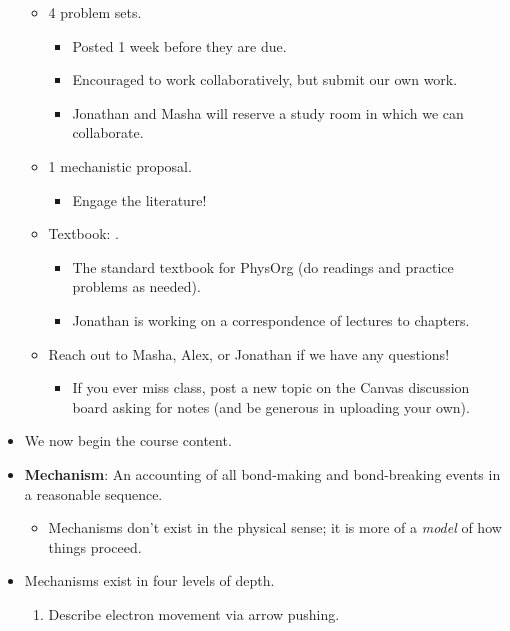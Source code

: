 \documentclass[../notes.tex]{subfiles}
\begin{document}
\begin{itemize}
\begin{itemize}
        \item 4 problem sets.
        \begin{itemize}
            \item Posted 1 week before they are due.
            \item Encouraged to work collaboratively, but submit our own work.
            \item Jonathan and Masha will reserve a study room in which we can collaborate.
        \end{itemize}
        \item 1 mechanistic proposal.
        \begin{itemize}
            \item Engage the literature!
        \end{itemize}
        \item Textbook: \textcite{bib:Anslyn}.
        \begin{itemize}
            \item The standard textbook for PhysOrg (do readings and practice problems as needed).
            \item Jonathan is working on a correspondence of lectures to chapters.
        \end{itemize}
        \item Reach out to Masha, Alex, or Jonathan if we have any questions!
        \begin{itemize}
            \item If you ever miss class, post a new topic on the Canvas discussion board asking for notes (and be generous in uploading your own).
        \end{itemize}
    \end{itemize}
    \item We now begin the course content.
    \item \textbf{Mechanism}: An accounting of all bond-making and bond-breaking events in a reasonable sequence.
    \begin{itemize}
        \item Mechanisms don't exist in the physical sense; it is more of a \emph{model} of how things proceed.
    \end{itemize}
    \item Mechanisms exist in four levels of depth.
    \begin{enumerate}
        \item Describe electron movement via arrow pushing.
        \begin{figure}[h!]

\end{figure}
\end{enumerate}
\end{itemize}
\end{document}
